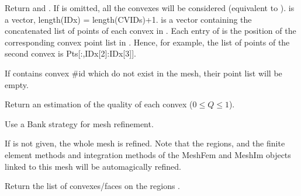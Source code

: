 \documentclass[a4paper,11pt,english]{sphinxmanual}
\begin{document}
\begin{fulllineitems}
\begin{fulllineitems}
Return  and .
If  is omitted, all the convexes will be considered
(equivalent to ).  is a
vector, length(IDx) = length(CVIDs)+1.  is a
vector containing the concatenated list of points
of each convex in . Each entry of  is the position
of the corresponding convex point list in . Hence, for
example, the list of points of the second convex is
Pts{[}:,IDx{[}2{]}:IDx{[}3{]}{]}.

If  contains convex \#id which do not exist in the mesh,
their point list will be empty.

\end{fulllineitems}


\begin{fulllineitems}
\label{\detokenize{python/cmdref_Mesh:getfem.Mesh.quality}}
Return an estimation of the quality of each convex (\(0 \leq Q \leq 1\)).

\end{fulllineitems}


\begin{fulllineitems}
\label{\detokenize{python/cmdref_Mesh:getfem.Mesh.refine}}
Use a Bank strategy for mesh refinement.

If  is not given, the whole mesh is refined. Note
that the regions, and the finite element methods and
integration methods of the MeshFem and MeshIm objects linked
to this mesh will be automagically refined.

\end{fulllineitems}


\begin{fulllineitems}
\label{\detokenize{python/cmdref_Mesh:getfem.Mesh.region}}
Return the list of convexes/faces on the regions .


\end{fulllineitems}
\end{fulllineitems}
\end{document}
